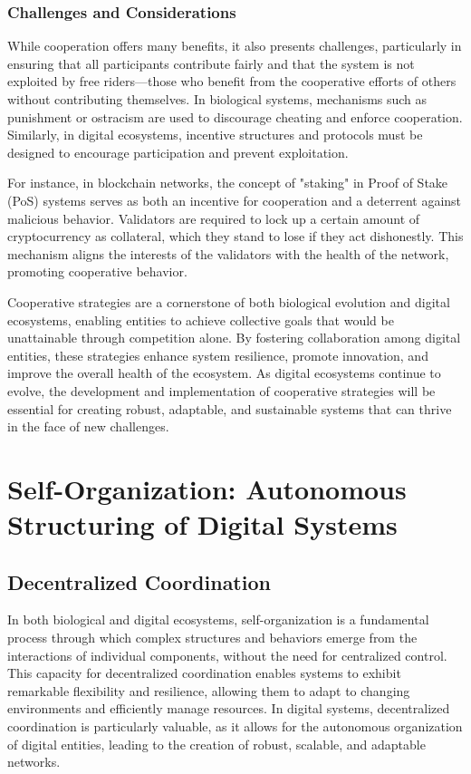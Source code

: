\documentclass[12pt,twoside]{article}
\begin{document}
\subsubsection{Challenges and Considerations}

While cooperation offers many benefits, it also presents challenges, particularly in ensuring that all participants contribute fairly and that the system is not exploited by free riders—those who benefit from the cooperative efforts of others without contributing themselves. In biological systems, mechanisms such as punishment or ostracism are used to discourage cheating and enforce cooperation. Similarly, in digital ecosystems, incentive structures and protocols must be designed to encourage participation and prevent exploitation.

For instance, in blockchain networks, the concept of "staking" in Proof of Stake (PoS) systems serves as both an incentive for cooperation and a deterrent against malicious behavior. Validators are required to lock up a certain amount of cryptocurrency as collateral, which they stand to lose if they act dishonestly. This mechanism aligns the interests of the validators with the health of the network, promoting cooperative behavior.

Cooperative strategies are a cornerstone of both biological evolution and digital ecosystems, enabling entities to achieve collective goals that would be unattainable through competition alone. By fostering collaboration among digital entities, these strategies enhance system resilience, promote innovation, and improve the overall health of the ecosystem. As digital ecosystems continue to evolve, the development and implementation of cooperative strategies will be essential for creating robust, adaptable, and sustainable systems that can thrive in the face of new challenges.

\section{Self-Organization: Autonomous Structuring of Digital Systems}

\subsection{Decentralized Coordination}

In both biological and digital ecosystems, self-organization is a fundamental process through which complex structures and behaviors emerge from the interactions of individual components, without the need for centralized control. This capacity for decentralized coordination enables systems to exhibit remarkable flexibility and resilience, allowing them to adapt to changing environments and efficiently manage resources. In digital systems, decentralized coordination is particularly valuable, as it allows for the autonomous organization of digital entities, leading to the creation of robust, scalable, and adaptable networks.
\end{document}
